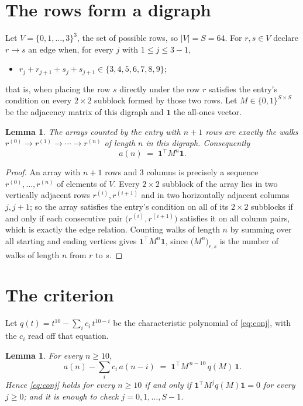 \documentclass[11pt,a4paper]{article}
\theoremstyle{plain}
\newtheorem{lemma}[theorem]{Lemma}
\theoremstyle{definition}
\begin{document}
\section{The rows form a digraph}

Let $V=\{0,1,\dots,3\}^{3}$, the set of possible rows, so $|V|=S=64$. For
$r,s\in V$ declare $r\to s$ an edge when, for every $j$ with $1\le j\le 3-1$,
\begin{itemize}
\item $r_j+r_{j+1}+s_j+s_{j+1}\in\{3, 4, 5, 6, 7, 8, 9\}$;

\end{itemize}
that is, when placing the row $s$ directly under the row $r$ satisfies the entry's
condition on every $2\times2$ subblock formed by those two rows. Let $M\in\{0,1\}^{S\times
S}$ be the adjacency matrix of this digraph and $\mathbf{1}$ the all-ones vector.

\begin{lemma}\label{lem:walk}
The arrays counted by the entry with $n+1$ rows are exactly the walks
$r^{(0)}\to r^{(1)}\to\cdots\to r^{(n)}$ of length $n$ in this digraph. Consequently
\[
a(n)\;=\;\mathbf{1}^{\!\top}M^{n}\mathbf{1} .
\]
\end{lemma}

\begin{proof}
An array with $n+1$ rows and $3$ columns is precisely a sequence
$r^{(0)},\dots,r^{(n)}$ of elements of $V$. Every $2\times2$ subblock of the array lies
in two vertically adjacent rows $r^{(i)},r^{(i+1)}$ and in two horizontally adjacent
columns $j,j+1$; so the array satisfies the entry's condition on all of its $2\times2$
subblocks if and only if each consecutive pair $\bigl(r^{(i)},r^{(i+1)}\bigr)$ satisfies
it on all column pairs, which is exactly the edge relation. Counting walks of length $n$ by
summing over all starting and ending vertices gives
$\mathbf{1}^{\!\top}M^{n}\mathbf{1}$, since
$\bigl(M^{n}\bigr)_{r,s}$ is the number of walks of length $n$ from $r$ to $s$.
\end{proof}

\section{The criterion}

Let $q(t)=t^{10}-\sum_{i}c_i\,t^{10-i}$ be the characteristic polynomial of
\eqref{eq:conj}, with the $c_i$ read off that equation.

\begin{lemma}\label{lem:crit}
For every $n\ge10$,
\[
a(n)-\sum_i c_i\,a(n-i)\;=\;\mathbf{1}^{\!\top}M^{\,n-10}\,q(M)\,\mathbf{1} .
\]
Hence \eqref{eq:conj} holds for every $n\ge10$ if and only if
$\mathbf{1}^{\!\top}M^{j}q(M)\mathbf{1}=0$ for every $j\ge0$; and it is enough to
check $j=0,1,\dots,S-1$.
\end{lemma}
\end{document}
